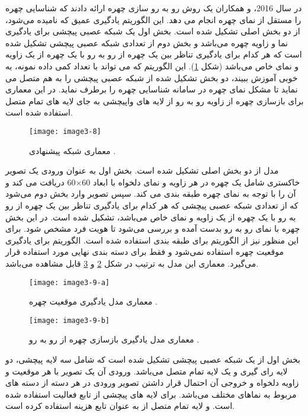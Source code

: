 \noindent
در سال 2016،  و همکاران \cite{7532959} یک روش رو به رو سازی چهره ارائه دادند که شناسایی چهره را مستقل از نمای چهره  انجام می دهد. این الگوریتم یادگیری عمیق که  نامیده می‌شود، از دو بخش اصلی تشکیل شده است. بخش اول یک شبکه عصبی پیچشی برای یادگیری نما و زاویه چهره می‌باشد و بخش دوم از تعدادی شبکه عصبی پیچشی تشکیل شده است که هر کدام برای یادگیری تناظر  بین یک چهره از رو به رو با یک چهره از یک زاویه و نمای خاص می‌باشد (شکل \ref{image3-8}). این الگوریتم که می تواند با تعداد کمی داده نمونه، به خوبی آموزش ببیند، دو بخش تشکیل شده از شبکه عصبی پیچشی را به هم متصل می نماید تا مشکل نمای چهره در سامانه شناسایی چهره را برطرف نماید. در این معماری برای بازسازی چهره از زاویه رو به رو از لایه های واپیچشی  به جای لایه های تمام متصل استفاده شده است.

\begin{figure}[h]
\centering
  \texttt{[image: image3-8]}
  \caption{معماری شبکه پیشنهادی   \cite{7532959}.}
  \label{image3-8}
\end{figure}

\noindent
مدل  از دو بخش اصلی تشکیل شده است. بخش اول به عنوان ورودی یک تصویر خاکستری  شامل یک چهره در هر زاویه و نمای دلخواه با ابعاد 60×60 دریافت می کند و آن را با توجه به نمای چهره طبقه بندی  می کند. سپس تصویر وارد بخش دوم می‌شود که از تعدادی شبکه عصبی پیچشی که هر کدام برای یادگیری تناظر بین یک چهره از رو به رو با یک چهره از یک زاویه و نمای خاص می‌باشد، تشکیل شده است. در این بخش چهره با نمای رو به رو بدست آمده و بررسی می‌شود تا هویت فرد مشخص شود. برای این منظور نیز از الگوریتم   برای طبقه بندی استفاده شده است. الگوریتم  برای یادگیری موقعیت چهره استفاده نمی‌شود و فقط برای دسته بندی نهایی مورد استفاده قرار می‌گیرد. معماری این مدل به ترتیب در شکل \ref{image3-9-a} و \ref{image3-9-b} قابل مشاهده می‌باشد.

\begin{figure}[h]
	\centering
	\texttt{[image: image3-9-a]}
	\caption{ معماری مدل یادگیری موقعیت چهره \cite{7532959}.}
	\label{image3-9-a}
\end{figure}

\begin{figure}[h]
\centering
  \texttt{[image: image3-9-b]}
  \caption{ معماری مدل یادگیری بازسازی چهره از رو به رو \cite{7532959}.}
  \label{image3-9-b}
\end{figure}

\noindent
بخش اول از یک شبکه عصبی پیچشی تشکیل شده است که شامل سه لایه پیچشی، دو لایه رای گیری و یک لایه تمام متصل می‌باشد. ورودی آن یک تصویر با هر موقعیت و زاویه دلخواه و خروجی آن احتمال قرار داشتن تصویر ورودی در هر دسته از دسته های مربوط به نماهای مختلف می‌باشد. برای لایه های پیچشی از تابع فعالیت  استفاده شده است. و لایه تمام متصل از  به عنوان تابع هزینه استفاده کرده است.

